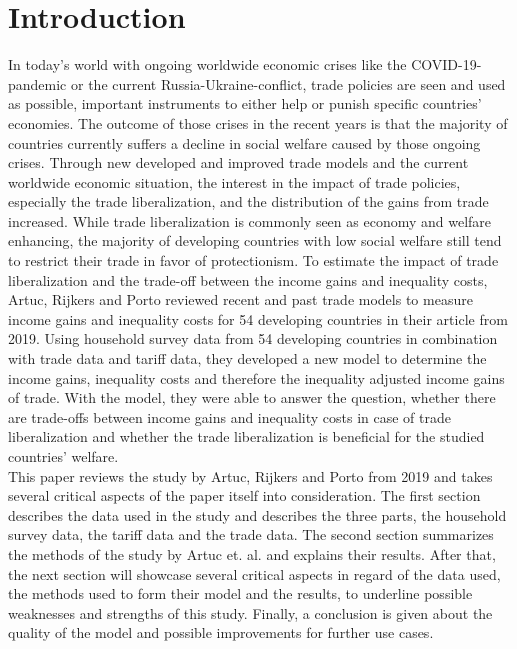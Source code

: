 \chapter{Introduction}
In today's world with ongoing worldwide economic crises like the COVID-19-pandemic or the current Russia-Ukraine-conflict,
trade policies are seen and used as possible, important instruments to either help or punish specific countries' economies. 
The outcome of those crises in the recent years is that the majority of countries currently suffers a decline in social welfare 
caused by those ongoing crises. Through new developed and improved trade models and the current worldwide economic situation, the interest 
in the impact of trade policies, especially the trade liberalization, and the distribution of the gains from trade increased. 
While trade liberalization is commonly seen as economy and welfare enhancing, the majority of developing countries with low social welfare
still tend to restrict their trade in favor of protectionism. To estimate the impact of trade liberalization and the trade-off
between the income gains and inequality costs, Artuc, Rijkers and Porto reviewed recent and past trade models to measure 
income gains and inequality costs for 54 developing countries in their article from 2019. Using household survey data from 54
developing countries in combination with trade data and tariff data, they developed a new model to determine the income gains,
inequality costs and therefore the inequality adjusted income gains of trade. With the model, they were able to answer the
question, whether there are trade-offs between income gains and inequality costs in case of trade liberalization and whether
the trade liberalization is beneficial for the studied countries' welfare.\\

This paper reviews the study by Artuc, Rijkers and Porto from 2019 and takes several critical aspects of the paper itself into consideration.
The first section describes the data used in the study and describes the three parts, the household survey data, the tariff data
and the trade data. The second section summarizes the methods of the study by Artuc et. al. and explains their results.
After that, the next section will showcase several critical aspects in regard of the data used, 
the methods used to form their model and the results, to underline possible weaknesses and strengths of this study. 
Finally, a conclusion is given about the quality of the model and possible improvements for further use cases. 